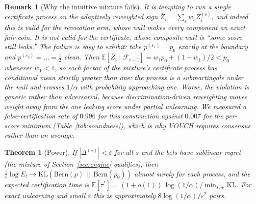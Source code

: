 \documentclass[pdflatex,sn-mathphys-num]{sn-jnl}
\theoremstyle{thmstyleone}
\newtheorem{theorem}{Theorem}
\theoremstyle{thmstyletwo}
\newtheorem{remark}{Remark}
\theoremstyle{thmstylethree}
\newcommand{\F}{\mathcal{F}}
\newcommand{\KL}{\mathrm{KL}}
\newcommand{\Bern}{\mathrm{Bern}}
\newcommand{\eps}{\varepsilon}
\newcommand{\Efrak}{\mathbb{E}}
\begin{document}
\begin{remark}[Why the intuitive mixture fails]\label{rem:mixture}
It is tempting to run a \emph{single} certificate process on the adaptively reweighted
sign $\bar Z_i = \sum_s w_s Z_i^{(s)}$, and indeed this is valid for the revocation arm,
whose null makes every component an exact fair coin. It is \emph{not} valid for the
certificate, whose composite null is ``some score still leaks.'' The failure is easy to
exhibit: take $p^{(s_1)} = p_0$ exactly at the boundary and
$p^{(s_2)} = \dots = \tfrac12$ clean. Then
$\Efrak[\bar Z_i \mid \F_{i-1}] = w_1 p_0 + (1 - w_1)/2 < p_0$ whenever $w_1 < 1$, so
each factor of the mixture's certificate process has conditional mean strictly greater
than one: the process is a \emph{sub}martingale under the null and crosses $1/\alpha$
with probability approaching one. Worse, the violation is generic rather than
adversarial, because discrimination-driven reweighting moves weight \emph{away} from
the one leaking score under partial unlearning. We measured a false-certification rate
of $0.996$ for this construction against $0.007$ for the per-score minimum
(Table~\ref{tab:soundness}), which is why VOUCH requires consensus rather than an
average.
\end{remark}

\begin{theorem}[Power]\label{thm:power}
If $|\Delta^{(s)}| < \eps$ for all $s$ and the bets have sublinear regret (the mixture
of Section~\ref{sec:engine} qualifies), then
$\tfrac1t \log E_t \to \KL(\Bern(p)\,\|\,\Bern(p_0))$ almost
surely for each process, and the expected certification time is
$\Efrak[\tau^*] = (1+o(1))\,\log(1/\alpha)/\min_{s,\pm}\KL$. For exact unlearning and
small $\eps$ this is approximately $8\log(1/\alpha)/\eps^2$ pairs.
\end{theorem}
\end{document}
